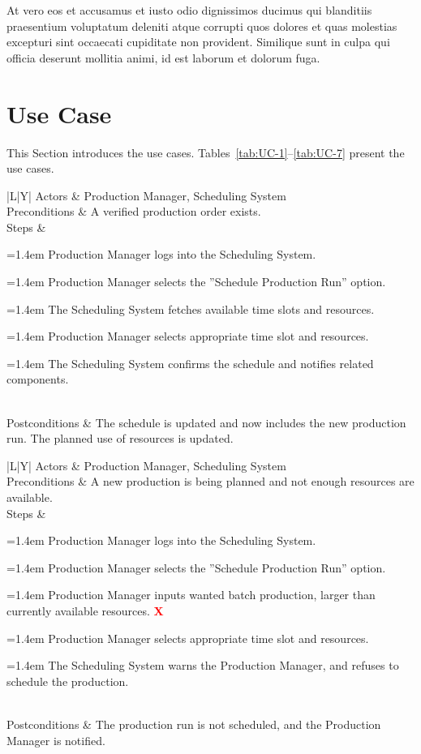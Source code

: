 \documentclass[conference]{IEEEtran}
\newcounter{ucstep}
\newenvironment{ucsteps}{%
  \begin{minipage}[t]{\linewidth}\raggedright%
  \setcounter{ucstep}{0}%
  \def\item{\par\stepcounter{ucstep}\hangindent=1.4em\hangafter=1%
    \noindent\makebox[1.4em][l]{\theucstep.}\ignorespaces}%
}{%
  \strut\end{minipage}%
}
\newcommand{\usecase}[6]{%
  \begin{table}[htbp]
    \centering
    \caption{#1: #2}
    \label{tab:#1}
    \footnotesize
    \renewcommand{\arraystretch}{1.3}%
    \begin{tabularx}{\columnwidth}{|L|Y|}
      \hline
      Actors         & #3 \\ \hline
      Preconditions  & #4 \\ \hline
      Steps          & #5 \\ \hline
      Postconditions & #6 \\ \hline
    \end{tabularx}
  \end{table}%
}
\newcommand{\rx}{\textcolor{red}{\textbf{X}}}
\begin{document}
At vero eos et accusamus et iusto odio dignissimos ducimus qui blanditiis praesentium voluptatum deleniti atque corrupti quos dolores et quas molestias excepturi sint occaecati cupiditate non provident. Similique sunt in culpa qui officia deserunt mollitia animi, id est laborum et dolorum fuga.

\section{Use Case}
\label{sec:use_case}
This Section introduces the use cases.
Tables~\ref{tab:UC-1}--\ref{tab:UC-7} present the use cases.

\usecase{UC-1}{Schedule Production Run}
  {Production Manager, Scheduling System}
  {A verified production order exists.}
  {%
    \begin{ucsteps}
      \item Production Manager logs into the Scheduling System.
      \item Production Manager selects the ”Schedule Production Run” option.
      \item The Scheduling System fetches available time slots and resources.
      \item Production Manager selects appropriate time slot and resources.
      \item The Scheduling System confirms the schedule and notifies related components.
    \end{ucsteps}%
  }
  {The schedule is updated and now includes the new production run. The planned use of resources is updated.}

\usecase{UC-2}{Warn if scheduled production run is low on resources}
  {Production Manager, Scheduling System}
  {A new production is being planned and not enough resources are available.}
  {%
    \begin{ucsteps}
      \item Production Manager logs into the Scheduling System.
      \item Production Manager selects the ”Schedule Production Run” option.
      \item Production Manager inputs wanted batch production, larger than currently available resources. \rx %
      \item Production Manager selects appropriate time slot and resources.
      \item The Scheduling System warns the Production Manager, and refuses to schedule the production.
    \end{ucsteps}%
  }
  {The production run is not scheduled, and the Production Manager is notified.}
\end{document}
